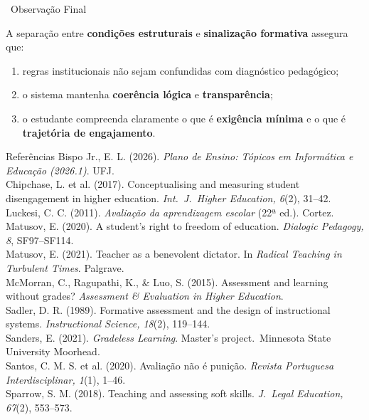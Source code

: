 \documentclass[xcolor=dvipsnames,table]{beamer}
\begin{document}
  \begin{frame}{\faLightbulb\ Observação Final}
    \begin{exampleblock}{}
      A separação entre \textbf{condições estruturais} e \textbf{sinalização formativa} assegura
      que:
      \begin{enumerate}
        \item regras institucionais não sejam confundidas com diagnóstico pedagógico;
        \pause
        \item o sistema mantenha \textbf{coerência lógica} e \textbf{transparência};
        \pause
        \item o estudante compreenda claramente o que é \textbf{exigência mínima} e o que é
          \textbf{trajetória de engajamento}.
      \end{enumerate}
    \end{exampleblock}
  \end{frame}

  \begin{frame}[allowframebreaks]{Referências}
    \footnotesize
    Bispo Jr., E. L. (2026). \textit{Plano de Ensino: Tópicos em Informática e Educação
      (2026.1)}. UFJ. \\[4pt]
    Chipchase, L. et al. (2017). Conceptualising and measuring student disengagement in higher
      education. \textit{Int.\ J.\ Higher Education, 6}(2), 31--42. \\[4pt]
    Luckesi, C. C. (2011). \textit{Avaliação da aprendizagem escolar} (22ª ed.). Cortez. \\[4pt]
    Matusov, E. (2020). A student's right to freedom of education. \textit{Dialogic Pedagogy,
      8}, SF97--SF114. \\[4pt]
    Matusov, E. (2021). Teacher as a benevolent dictator. In \textit{Radical Teaching in
      Turbulent Times}. Palgrave. \\[4pt]
    McMorran, C., Ragupathi, K., \& Luo, S. (2015). Assessment and learning without grades?
      \textit{Assessment \& Evaluation in Higher Education}. \\[4pt]
    Sadler, D. R. (1989). Formative assessment and the design of instructional systems.
      \textit{Instructional Science, 18}(2), 119--144. \\[4pt]
    Sanders, E. (2021). \textit{Gradeless Learning}. Master's project.\ Minnesota State
      University Moorhead. \\[4pt]
    Santos, C. M. S. et al. (2020). Avaliação não é punição. \textit{Revista Portuguesa
      Interdisciplinar, 1}(1), 1--46. \\[4pt]
    Sparrow, S. M. (2018). Teaching and assessing soft skills. \textit{J.\ Legal Education,
      67}(2), 553--573.
  \end{frame}

  \begin{frame}
    \titlepage
  \end{frame}
\end{document}
